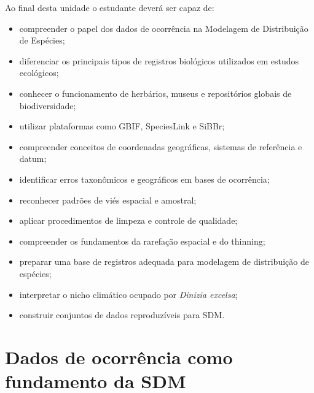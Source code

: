 \begin{objetivos}
	
	Ao final desta unidade o estudante deverá ser capaz de:
	
	\begin{itemize}
		
		\item compreender o papel dos dados de ocorrência na Modelagem de Distribuição de Espécies;
		
		\item diferenciar os principais tipos de registros biológicos utilizados em estudos ecológicos;
		
		\item conhecer o funcionamento de herbários, museus e repositórios globais de biodiversidade;
		
		\item utilizar plataformas como GBIF, SpeciesLink e SiBBr;
		
		\item compreender conceitos de coordenadas geográficas, sistemas de referência e datum;
		
		\item identificar erros taxonômicos e geográficos em bases de ocorrência;
		
		\item reconhecer padrões de viés espacial e amostral;
		
		\item aplicar procedimentos de limpeza e controle de qualidade;
		
		\item compreender os fundamentos da rarefação espacial e do thinning;
		
		\item preparar uma base de registros adequada para modelagem de distribuição de espécies;
		
		\item interpretar o nicho climático ocupado por \textit{Dinizia excelsa};
		
		\item construir conjuntos de dados reproduzíveis para SDM.
		
	\end{itemize}
	
\end{objetivos}

\section{Dados de ocorrência como fundamento da SDM}

